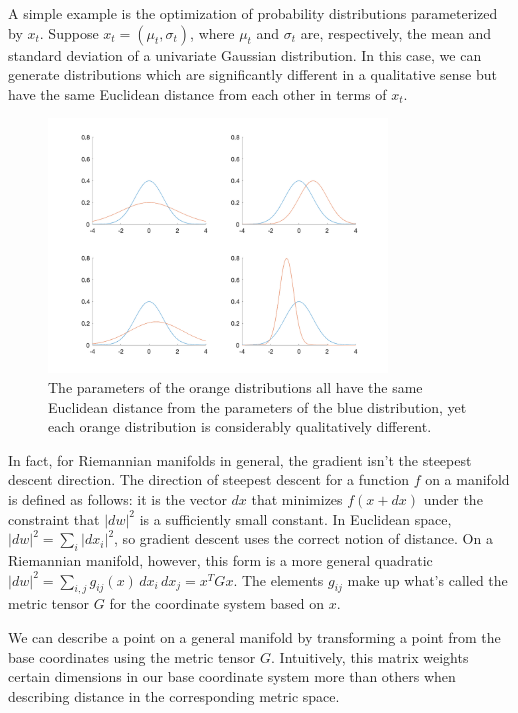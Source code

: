 \documentclass[twoside,10pt]{article}
\begin{document}
A simple example is the optimization of probability distributions parameterized by $x_t$. Suppose $x_t = (\mu_t, \sigma_t)$, where $\mu_t$ and $\sigma_t$ are, respectively, the mean and standard deviation of a univariate Gaussian distribution. In this case, we can generate distributions which are significantly different in a qualitative sense but have the same Euclidean distance from each other in terms of $x_t$.

\begin{figure}[H]
    \centering
    \includegraphics[width=9cm]{img/gaussians.png}
    \caption{The parameters of the orange distributions all have the same Euclidean distance from the parameters of the blue distribution, yet each orange distribution is considerably qualitatively different.}
\end{figure}

In fact, for Riemannian manifolds in general, the gradient isn't the steepest descent direction\cite{amari}. The direction of steepest descent for a function $f$ on a manifold is defined as follows: it is the vector $dx$ that minimizes $f(x+dx)$ under the constraint that $\vert dw \vert^2$ is a sufficiently small constant. In Euclidean space, $\vert dw \vert^2 = \sum_i \vert dx_i \vert^2$, so gradient descent uses the correct notion of distance. On a Riemannian manifold, however, this form is a more general quadratic $\vert dw \vert^2 = \sum_{i,j} g_{ij}(x) \, dx_i \, dx_j = x^T G x$. The elements $g_{ij}$ make up what's called the metric tensor $G$ for the coordinate system based on $x$.\cite{amari}

We can describe a point on a general manifold by transforming a point from the base coordinates using the metric tensor $G$. Intuitively, this matrix weights certain dimensions in our base coordinate system more than others when describing distance in the corresponding metric space.
\end{document}
